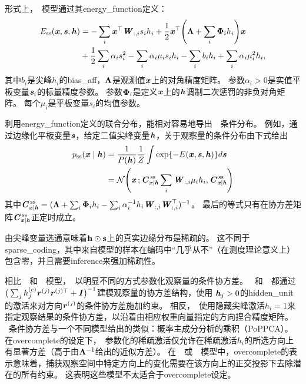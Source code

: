 形式上，~模型通过其\gls{energy_function}定义：
\begin{align}
 E_{\text{ss}}(\Vx, \Vs, \Vh) &= - \sum_i \Vx^\top \MW_{:,i} s_i h_i + \frac{1}{2} \Vx^\top
 \Bigg( \VLambda + \sum_i \VPhi_i h_i \Bigg) \Vx \\
 &+ \frac{1}{2} \sum_i \alpha_i s_i^2 - \sum_i \alpha_i \mu_i s_i h_i - \sum_i b_i h_i 
 + \sum_i \alpha_i \mu_i^2 h_i,
 \end{align}
其中$b_i$是尖峰$h_i$的\gls{bias_aff}，$\VLambda$是观测值$\Vx$上的对角精度矩阵。
参数$\alpha_i > 0$是实值平板变量$\Vs_i$的标量精度参数。
参数$\VPhi_i$是定义$\Vx$上的$\Vh$调制二次惩罚的非负对角矩阵。
每个$\mu_i$是平板变量$s_i$的均值参数。


利用\gls{energy_function}定义的联合分布，能相对容易地导出~~条件分布。
例如，通过边缘化平板变量$\Vs$，给定二值尖峰变量$\Vh$，关于观察量的条件分布由下式给出
\begin{align}
 p_{\text{ss}} (\Vx  \mid  \Vh) &= \frac{1}{P(\Vh)} \frac{1}{Z} \int \exp\{ -E(\Vx, \Vs, \Vh) \} d\Vs \\
 &= \CalN \Bigg( \Vx\,; \MC_{\Vx \mid \Vh}^{\,\text{ss}} \sum_i \MW_{:,i}\mu_i h_i, 
  \MC_{\Vx \mid \Vh}^{\,\text{ss}} \Bigg)
\end{align}
其中$ \MC_{\Vx \mid \Vh}^{\,\text{ss}} = (\VLambda + \sum_i \VPhi_i h_i 
-\sum_i \alpha_i^{-1} h_i \MW_{:,i}\MW_{:,i}^\top)^{-1}$。
最后的等式只有在协方差矩阵$\MC_{\Vx \mid \Vh}^{\,\text{ss}} $正定时成立。

由尖峰变量选通意味着$\RVh \odot \RVs$上的真实边缘分布是稀疏的。
这不同于\gls{sparse_coding}，其中来自模型的样本在编码中``几乎从不''（在测度理论意义上）包含零，并且需要\gls{inference}来强加稀疏性。


相比~~和~~模型，~以明显不同的方式参数化观察量的条件协方差。
~和~~都通过 $\big( \sum_j h_j^{(c)} \Vr^{(j)} \Vr^{(j)\top} + \MI \big)^{-1}$建模观察量的协方差结构，使用 $\Vh_j > 0$的\gls{hidden_unit}的激活来对方向$\Vr^{(j)}$的条件协方差施加约束。
相反，~使用隐藏尖峰激活$h_i = 1$来指定观察结果的条件协方差，以沿着由相应权重向量指定的方向捏合精度矩阵。
~条件协方差与一个不同模型给出的类似：概率主成分分析的乘积（PoPPCA）\citep{Williams2002}。
在\gls{overcomplete}的设定下，~参数化的稀疏激活仅允许在稀疏激活$h_i$的所选方向上有显著方差（高于由$\VLambda^{-1}$给出的近似方差）。
在~~或~~模型中，\gls{overcomplete}的表示意味着，捕获观察空间中特定方向上的变化需要在该方向上的正交投影下去除潜在的所有约束。
这表明这些模型不太适合于\gls{overcomplete}设定。

